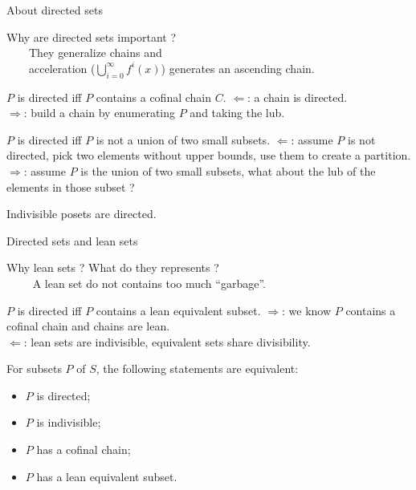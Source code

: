 \documentclass{beamer}
\begin{document}
\begin{frame}{About directed sets}

Why are directed sets important ?\\
\mbox{}~~~~They generalize chains and\\
\mbox{}~~~~acceleration ($\bigcup_{i=0}^\infty f^i(x)$) generates an ascending chain.

\vspace{10pt}

\begin{block}{$P$ is directed iff $P$ contains a cofinal chain $C$.}
$\Leftarrow$: a chain is directed.\\
$\Rightarrow$: build a chain by enumerating $P$ and taking the lub.
\end{block}

\vspace{10pt}

\begin{block}{$P$ is directed iff $P$ is not a union of two small subsets.}
$\Leftarrow$: assume $P$ is not directed, pick two elements without upper bounds, use them to create a partition.\\
$\Rightarrow$: assume $P$ is the union of two small subsets, what about the lub of the elements in those subset ?
\end{block}

\vspace{10pt}

Indivisible posets are directed.

\end{frame}

\begin{frame}{Directed sets and lean sets}

Why lean sets ? What do they represents ?\\
\mbox{}~~~~ A lean set do not contains too much ``garbage''.

\vspace{10pt}

\begin{block}{$P$ is directed iff $P$ contains a lean equivalent subset.}
$\Rightarrow$: we know $P$ contains a cofinal chain and chains are lean.\\
$\Leftarrow$: lean sets are indivisible, equivalent sets share divisibility.
\end{block}

\vspace{10pt}

For subsets $P$ of $S$, the following statements are equivalent:
\begin{itemize}
\item $P$ is directed;
\item $P$ is indivisible;
\item $P$ has a cofinal chain;
\item $P$ has a lean equivalent subset.
\end{itemize}

\end{frame}
\end{document}
